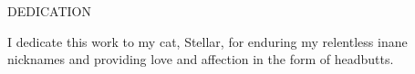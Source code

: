 \begin{center}
DEDICATION
\end{center}

I dedicate this work to my cat, Stellar, for enduring my relentless inane nicknames and providing love and affection in the form of headbutts. 
